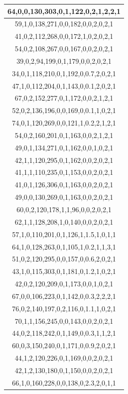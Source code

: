 \documentclass{article}
\begin{document}
\begin{table}[h!]
\begin{tabular}{|c|}
64,0,0,130,303,0,1,122,0,2,1,2,2,1 \\ \hline
59,1,0,138,271,0,0,182,0,0,2,0,2,1 \\ \hline
41,0,2,112,268,0,0,172,1,0,2,0,2,1 \\ \hline
54,0,2,108,267,0,0,167,0,0,2,0,2,1 \\ \hline
39,0,2,94,199,0,1,179,0,0,2,0,2,1 \\ \hline
34,0,1,118,210,0,1,192,0,0.7,2,0,2,1 \\ \hline
47,1,0,112,204,0,1,143,0,0.1,2,0,2,1 \\ \hline
67,0,2,152,277,0,1,172,0,0,2,1,2,1 \\ \hline
52,0,2,136,196,0,0,169,0,0.1,1,0,2,1 \\ \hline
74,0,1,120,269,0,0,121,1,0.2,2,1,2,1 \\ \hline
54,0,2,160,201,0,1,163,0,0,2,1,2,1 \\ \hline
49,0,1,134,271,0,1,162,0,0,1,0,2,1 \\ \hline
42,1,1,120,295,0,1,162,0,0,2,0,2,1 \\ \hline
41,1,1,110,235,0,1,153,0,0,2,0,2,1 \\ \hline
41,0,1,126,306,0,1,163,0,0,2,0,2,1 \\ \hline
49,0,0,130,269,0,1,163,0,0,2,0,2,1 \\ \hline
60,0,2,120,178,1,1,96,0,0,2,0,2,1 \\ \hline
62,1,1,128,208,1,0,140,0,0,2,0,2,1 \\ \hline
57,1,0,110,201,0,1,126,1,1.5,1,0,1,1 \\ \hline
64,1,0,128,263,0,1,105,1,0.2,1,1,3,1 \\ \hline
51,0,2,120,295,0,0,157,0,0.6,2,0,2,1 \\ \hline
43,1,0,115,303,0,1,181,0,1.2,1,0,2,1 \\ \hline
42,0,2,120,209,0,1,173,0,0,1,0,2,1 \\ \hline
67,0,0,106,223,0,1,142,0,0.3,2,2,2,1 \\ \hline
76,0,2,140,197,0,2,116,0,1.1,1,0,2,1 \\ \hline
70,1,1,156,245,0,0,143,0,0,2,0,2,1 \\ \hline
44,0,2,118,242,0,1,149,0,0.3,1,1,2,1 \\ \hline
60,0,3,150,240,0,1,171,0,0.9,2,0,2,1 \\ \hline
44,1,2,120,226,0,1,169,0,0,2,0,2,1 \\ \hline
42,1,2,130,180,0,1,150,0,0,2,0,2,1 \\ \hline
66,1,0,160,228,0,0,138,0,2.3,2,0,1,1 \\ \hline

\end{tabular}
\end{table}
\end{document}
